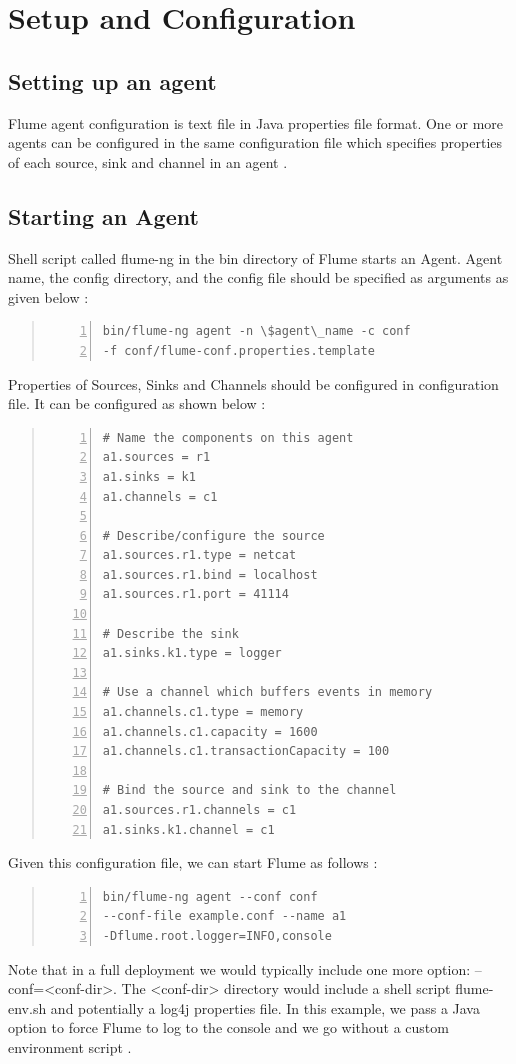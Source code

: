 \documentclass[9pt,twocolumn,twoside]{styles/osajnl}
\begin{document}
\section{Setup and Configuration}
\subsection{Setting up an agent}
Flume agent configuration is text file in Java properties file format. One or more agents can be configured in the same configuration file which specifies properties of each source, sink and channel in an agent \cite{user-manual}.

\subsection{Starting an Agent}
Shell script called flume-ng in the bin directory of Flume starts an Agent. Agent name, the config directory, and the config file should be specified as arguments as given below \cite{user-manual}:

\begin{quote}
\begin{Verbatim}[numbers=left]
bin/flume-ng agent -n \$agent\_name -c conf 
-f conf/flume-conf.properties.template
\end{Verbatim}
\end{quote}

Properties of Sources, Sinks and Channels should be configured in configuration file. It can be configured as shown below \cite{user-manual}:
\begin{quote}
\begin{Verbatim}[numbers=left]
# Name the components on this agent
a1.sources = r1
a1.sinks = k1
a1.channels = c1

# Describe/configure the source
a1.sources.r1.type = netcat
a1.sources.r1.bind = localhost
a1.sources.r1.port = 41114

# Describe the sink
a1.sinks.k1.type = logger

# Use a channel which buffers events in memory
a1.channels.c1.type = memory
a1.channels.c1.capacity = 1600
a1.channels.c1.transactionCapacity = 100

# Bind the source and sink to the channel
a1.sources.r1.channels = c1
a1.sinks.k1.channel = c1\end{Verbatim}
\end{quote}

Given this configuration file, we can start Flume as follows \cite{user-manual}:
\begin{quote}
\begin{Verbatim}[numbers=left]
bin/flume-ng agent --conf conf 
--conf-file example.conf --name a1 
-Dflume.root.logger=INFO,console
\end{Verbatim}
\end{quote}
Note that in a full deployment we would typically include one more option: --conf=<conf-dir>. The <conf-dir> directory would include a shell script flume-env.sh and potentially a log4j properties file. In this example, we pass a Java option to force Flume to log to the console and we go without a custom environment script \cite{user-manual}.
\end{document}
